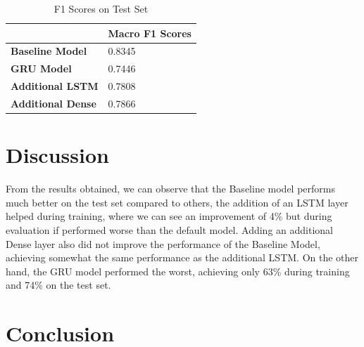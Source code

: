 \documentclass[11pt]{article}
\begin{document}
\begin{table}[ht]
\caption{F1 Scores on Test Set}
\begin{tabular}{|l|l|}
\hline
                                             & \textbf{Macro F1 Scores} \\ \hline
\textbf{Baseline Model}                      & 0.8345                   \\ \hline
\textbf{GRU Model}                           & 0.7446                   \\ \hline
\textbf{Additional LSTM} & 0.7808                   \\ \hline
\textbf{Additional Dense} & 0.7866                   \\ \hline
\end{tabular}
\label{Tab:Tcr_2}
\end{table}


\section{Discussion}
\label{sec:discussion}
From the results obtained, we can observe that the Baseline model performs much better on the test set compared to others, the addition of an LSTM layer helped during training, where we can see an improvement of 4\% but during evaluation if performed worse than the default model. Adding an additional Dense layer also did not improve the performance of the Baseline Model, achieving somewhat the same performance as the additional LSTM.
On the other hand, the GRU model performed the worst, achieving only 63\% during training and 74\% on the test set.





\section{Conclusion}
\label{sec:conclusion}
\end{document}
